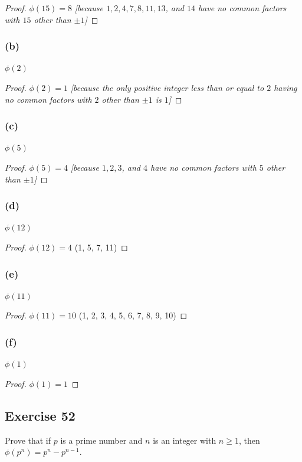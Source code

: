 \documentclass[14pt]{extarticle}
\begin{document}
\begin{proof}
\(\phi(15) = 8\) {\it [because $1, 2, 4, 7, 8, 11, 13$, and $14$ have no common factors with $15$ other than $\pm 1$]}
\end{proof}

\subsubsection{(b)}
\(\phi(2)\)

\begin{proof}
\(\phi(2) = 1\) {\it [because the only positive integer less than or equal to $2$ having no common factors with $2$ 
other than $\pm 1$ is $1$]}
\end{proof}

\subsubsection{(c)}
\(\phi(5)\)

\begin{proof}
\(\phi(5) = 4\) {\it [because $1, 2, 3$, and $4$ have no common factors with $5$ other than $\pm 1$]}
\end{proof}

\subsubsection{(d)}
\(\phi(12)\)

\begin{proof}
\(\phi(12) = 4\) (1, 5, 7, 11)
\end{proof}

\subsubsection{(e)}
\(\phi(11)\)

\begin{proof}
\(\phi(11) = 10\) (1, 2, 3, 4, 5, 6, 7, 8, 9, 10)
\end{proof}

\subsubsection{(f)}
\(\phi(1)\)

\begin{proof}
\(\phi(1) = 1\)
\end{proof}

\subsection{Exercise 52}
Prove that if $p$ is a prime number and $n$ is an integer with \(n \geq 1\), then \(\phi(p^n) = p^n - p^{n-1}\).
\end{document}

